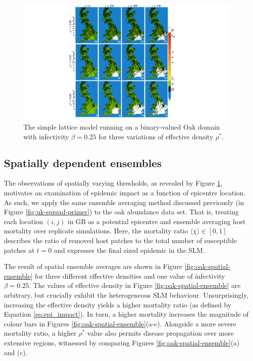 \begin{figure}
    \centering
    \includegraphics[scale=0.490]{chapter4/figures/figure4.pdf}
    \caption{The simple lattice model running on a binary-valued Oak domain with infectivity $\beta=0.25$ for three variations of effective density $\rho^*$.}
    \label{fig:ch4_uk_spread}
\end{figure}

\subsection{Spatially dependent ensembles}
\label{sec:slm-spatial-ensembles}

The observations of spatially varying thresholds, as revealed by Figure \ref{fig:ch4_uk_spread}, 
motivates an examination of epidemic impact as a function of epicentre location.
As such, we apply the same ensemble averaging method discussed previously (in Figure \ref{fig:uk-spread-primer})
to the oak abundance data set. That is, treating each location $(i,j)$ in GB as a potential
epicentre and ensemble averaging host mortality over replicate simulations.
Here, the mortality ratio $\big\langle \overline{\chi} \big\rangle \in [0, 1]$ describes the ratio 
of removed host patches to the total number of susceptible patches at $t=0$ and 
expresses the final sized epidemic in the SLM. 

The result of spatial ensemble averages are shown in Figure \ref{fig:oak-spatial-ensemble}
for three different effective densities and one value of infectivity $\beta=0.25$. 
The values of effective density in Figure \ref{fig:oak-spatial-ensemble} are arbitrary,
but crucially exhibit the heterogeneous SLM behaviour. Unsurprisingly, increasing the effective density yields a 
higher mortality ratio (as defined by Equation \ref{eq:epi_impact}).
In turn, a higher mortality increases the magnitude of colour bars in Figures \ref{fig:oak-spatial-ensemble}(a-c). Alongside a more severe mortality ratio, a higher $\rho^*$
value also permits disease propagation over more extensive regions, witnessed by comparing Figures \ref{fig:oak-spatial-ensemble}(a) and (c).

